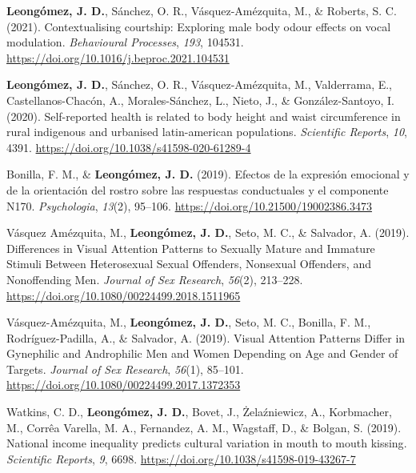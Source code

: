 \documentclass[11pt,a4paper,]{awesome-cv}
\begin{document}
\leavevmode{}%
\textbf{Leongómez, J. D.}, Sánchez, O. R., Vásquez-Amézquita, M., \&
Roberts, S. C. (2021). Contextualising courtship: Exploring male body
odour effects on vocal modulation. \emph{Behavioural Processes},
\emph{193}, 104531. \url{https://doi.org/10.1016/j.beproc.2021.104531}

\leavevmode{}%
\textbf{Leongómez, J. D.}, Sánchez, O. R., Vásquez-Amézquita, M.,
Valderrama, E., Castellanos-Chacón, A., Morales-Sánchez, L., Nieto, J.,
\& González-Santoyo, I. (2020). Self-reported health is related to body
height and waist circumference in rural indigenous and urbanised
latin-american populations. \emph{Scientific Reports}, \emph{10}, 4391.
\url{https://doi.org/10.1038/s41598-020-61289-4}

\leavevmode{}%
Bonilla, F. M., \& \textbf{Leongómez, J. D.} (2019). {Efectos de la
expresi{ó}n emocional y de la orientaci{ó}n del rostro sobre las
respuestas conductuales y el componente N170}. \emph{Psychologia},
\emph{13}(2), 95--106. \url{https://doi.org/10.21500/19002386.3473}

\leavevmode{}%
Vásquez Amézquita, M., \textbf{Leongómez, J. D.}, Seto, M. C., \&
Salvador, A. (2019). {Differences in Visual Attention Patterns to
Sexually Mature and Immature Stimuli Between Heterosexual Sexual
Offenders, Nonsexual Offenders, and Nonoffending Men}. \emph{Journal of
Sex Research}, \emph{56}(2), 213--228.
\url{https://doi.org/10.1080/00224499.2018.1511965}

\leavevmode{}%
Vásquez-Amézquita, M., \textbf{Leongómez, J. D.}, Seto, M. C., Bonilla,
F. M., Rodríguez-Padilla, A., \& Salvador, A. (2019). {Visual Attention
Patterns Differ in Gynephilic and Androphilic Men and Women Depending on
Age and Gender of Targets}. \emph{Journal of Sex Research},
\emph{56}(1), 85--101.
\url{https://doi.org/10.1080/00224499.2017.1372353}

\leavevmode{}%
Watkins, C. D., \textbf{Leongómez, J. D.}, Bovet, J., Żelaźniewicz, A.,
Korbmacher, M., Corrêa Varella, M. A., Fernandez, A. M., Wagstaff, D.,
\& Bolgan, S. (2019). {National income inequality predicts cultural
variation in mouth to mouth kissing}. \emph{Scientific Reports},
\emph{9}, 6698. \url{https://doi.org/10.1038/s41598-019-43267-7}
\end{document}
